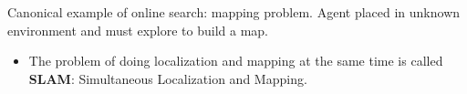 \documentclass[11pt]{article}
\begin{document}
Canonical example of online search: mapping problem.  Agent placed in unknown environment and must explore to build a map.

\begin{itemize}
\item The problem of doing localization and mapping at the same time is called \textbf{SLAM}: Simultaneous Localization and Mapping.
\end{itemize}
\end{document}
